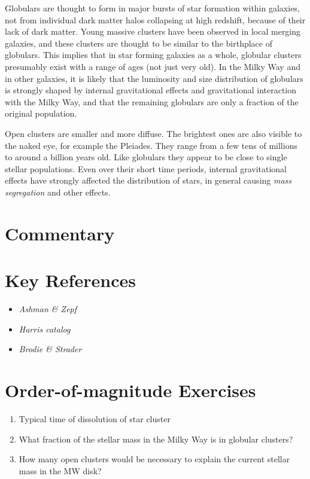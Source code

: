 Globulars are thought to form in major bursts of star formation within
galaxies, not from individual dark matter halos collapsing at high
redshift, because of their lack of dark matter. Young massive clusters
have been observed in local merging galaxies, and these clusters are
thought to be similar to the birthplace of globulars. This implies
that in star forming galaxies as a whole, globular clusters presumably
exist with a range of ages (not just very old).  In the Milky Way and
in other galaxies, it is likely that the luminosity and size
distribution of globulars is strongly shaped by internal
gravitational effects and gravitational interaction with the Milky
Way, and that the remaining globulars are only a fraction of the
original population.

Open clusters are smaller and more diffuse. The brightest ones are
also visible to the naked eye, for example the Pleiades. They range
from a few tens of millions to around a billion years old. Like
globulars they appear to be close to single stellar populations. Even
over their short time periods, internal gravitational effects have
strongly affected the distribution of stars, in general causing {\it
mass segregation} and other effects.

\section{Commentary}

\section{Key References}

\begin{itemize}
  \item
    {\it Ashman \& Zepf}
  \item
    {\it Harris catalog}
  \item
    {\it Brodie \& Strader}
\end{itemize}

\citet{gunn06a}

\section{Order-of-magnitude Exercises}

\begin{enumerate} 
\item Typical time of dissolution of star cluster
\item What fraction of the stellar mass in the Milky Way is in
    globular clusters?
\item How many open clusters would be necessary to explain the current
stellar mass in the MW disk?
\end{enumerate} 

